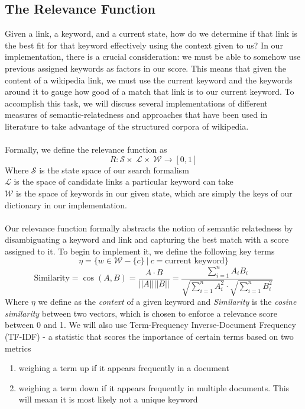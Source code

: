 \documentclass[twoside,11pt]{article}
\begin{document}
\subsection{The Relevance Function}
Given a link, a keyword, and a current state, how do we determine if that link is the best fit for that keyword effectively using the context given to us? In our implementation, there is a crucial consideration: we must be able to somehow use previous assigned keywords as factors in our score. This means that given the content of a wikipedia link, we must use the current keyword and the keywords around it to gauge how good of a match that link is to our current keyword. To accomplish this task, we will discuss several implementations of different measures of semantic-relatedness and approaches that have been used in literature to take advantage of the structured corpora of wikipedia.
\\ \\
Formally, we define the relevance function as
$$R: \mathcal{S} \times \ \mathcal{L} \times \ \mathcal{W} \rightarrow [0, 1]$$
Where $\mathcal{S}$ is the state space of our search formalism
\\
$\mathcal{L}$ is the space of candidate links a particular keyword can take
\\
$\mathcal{W}$ is the space of keywords in our given state, which are simply the keys of our dictionary in our implementation.
\\ \\
Our relevance function formally abstracts the notion of semantic relatedness by disambiguating a keyword and link and capturing the best match with a score assigned to it. To begin to implement it, we define the following key terms
$$\eta = \{w \in \mathcal{W} - \{c\} \ | \ c = \mbox{current keyword}\} $$
$$\mbox{Similarity} = \cos(A, B) = \frac{A \cdot B}{||A|| ||B||} = \frac{\sum_{i=1}^{n} A_iB_i}{\sqrt{\sum_{i=1}^{n} A_i^2} \cdot \sqrt{\sum_{i=1}^{n} B_i^2}}$$
Where $\eta$ we define as the \textit{context} of a given keyword and \textit{Similarity} is the \textit{cosine similarity} between two vectors, which is chosen to enforce a relevance score between 0 and 1. We will also use Term-Frequency Inverse-Document Frequency (TF-IDF) -  a statistic that scores the importance of certain terms based on two metrics

\begin{enumerate}
  \item weighing a term up if it appears frequently in a document
  \item weighing a term down if it appears frequently in multiple documents. This will meaan it is most likely not a unique keyword
\end{enumerate}
\end{document}
